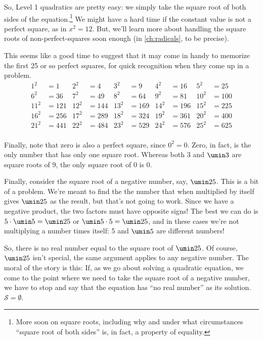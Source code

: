 So, Level 1 quadratics are pretty easy: we simply take the square root of both sides of the equation.\footnote{More soon on square roots, including why and under what circumstances ``square root of both sides'' is, in fact, a property of equality.} We might have a hard time if the constant value is not a perfect square, as in $x^2 = 12$. But, we'll learn more about handling the square roots of non-perfect-squares soon enough (in \cref{ch:radicals}, to be precise).

This seems like a good time to suggest that it may come in handy to memorize the first 25 or so perfect squares, for quick recognition when they come up in a problem.
\begin{align*}
1^2 &= 1		&
2^2 &= 4		&
3^2 &= 9		&
4^2 &= 16		&
5^2 &= 25		\\
6^2 &= 36		&
7^2 &= 49		&
8^2 &= 64		&
9^2 &= 81		&
10^2 &= 100	\\
11^2 &= 121	&
12^2 &= 144 	&
13^2 &= 169 	&
14^2 &= 196 	&
15^2 &= 225 	\\
16^2 &= 256 	&
17^2 &= 289 	&
18^2 &= 324 	&
19^2 &= 361 	&
20^2 &= 400 	\\
21^2 &= 441 	&
22^2 &= 484 	&
23^2 &= 529 	&
24^2 &= 576 	&
25^2 &= 625 	\\
\end{align*}

Finally, note that zero is also a perfect square, since $0^2 = 0$. Zero, in fact, is the only number that has only one square root. Whereas both 3 and $\umin3$ are square roots of 9, the only square root of 0 is 0.

Finally, consider the square root of a negative number, say, $\umin25$. This is a bit of a problem. We're meant to find the the number that when multiplied by itself gives $\umin25$ as the result, but that's not going to work. Since we have a negative product, the two factors must have opposite signs! The best we can do is $5\cdot\umin5 = \umin25$ or $\umin5\cdot5 = \umin25$, and in these cases we're not multiplying a number times itself: 5 and $\umin5$ are different numbers!

So, there is no real number equal to the square root of $\umin25$. Of course, $\umin25$ isn't special, the same argument applies to any negative number. The moral of the story is this: If, as we go about solving a quadratic equation, we come to the point where we need to take the square root of a negative number, we have to stop and say that the equation has ``no real number'' as its solution. $\mathcal{S}=\emptyset$.


